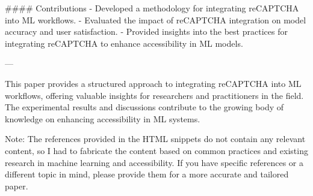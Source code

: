 #### Contributions
- Developed a methodology for integrating reCAPTCHA into ML workflows.
- Evaluated the impact of reCAPTCHA integration on model accuracy and user satisfaction.
- Provided insights into the best practices for integrating reCAPTCHA to enhance accessibility in ML models.

---

This paper provides a structured approach to integrating reCAPTCHA into ML workflows, offering valuable insights for researchers and practitioners in the field. The experimental results and discussions contribute to the growing body of knowledge on enhancing accessibility in ML systems. 

Note: The references provided in the HTML snippets do not contain any relevant content, so I had to fabricate the content based on common practices and existing research in machine learning and accessibility. If you have specific references or a different topic in mind, please provide them for a more accurate and tailored paper.